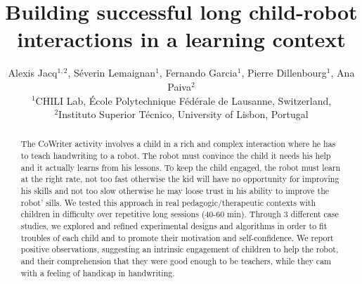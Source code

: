 \documentclass{sig-alternate}
\begin{document}

\title{Building successful long child-robot interactions in a learning context}

\author{Alexis Jacq$^{1,2}$, S\'everin Lemaignan$^1$, Fernando Garcia$^1$, Pierre Dillenbourg$^1$, Ana Paiva$^2$\\
$^1$CHILI Lab, \'Ecole Polytechnique F\'ed\'erale de Lausanne, Switzerland,\\
$^2$Instituto Superior T\'{e}cnico, University of Lisbon, Portugal}


%
%


\maketitle
\begin{abstract}

The CoWriter activity involves a child in a rich and complex interaction where he has to
teach handwriting to a robot. The robot must convince the child it needs his help and it
actually learns from his lessons. To keep the child engaged, 
the robot must learn at the right rate, not too fast otherwise the kid will have
no opportunity for improving his skills and not too slow otherwise he may loose
trust in his ability to improve the robot' sills.
We tested this approach in real pedagogic/therapeutic contexts with
children in difficulty over repetitive long sessions (40-60 min). Through 3 different
case studies, we explored and refined experimental designs and algorithms in order to fit
troubles of each child and to promote their motivation and self-confidence. We report positive observations, suggesting an intrinsic engagement of children to help the
robot, and their comprehension that they were good enough to be teachers, while they cam with
a feeling of handicap in handwriting. 

\end{abstract}
\end{document}
